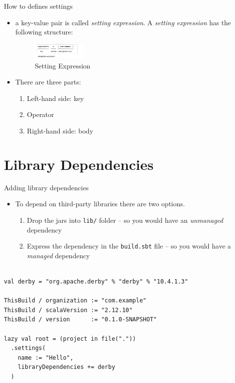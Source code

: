 \documentclass[presentation, aspectratio=169]{beamer}
\begin{document}
\begin{frame}[label={sec:org7a7a94f}]{How to defines settings}
\begin{itemize}
\item a key-value pair is called \emph{setting expression}. A \emph{setting expression} has the following structure:
\begin{figure}[htbp]
\centering
\includegraphics[width=100px]{./img/setting-expression.png}
\caption{\label{fig:org02a0ebb}Setting Expression}
\end{figure}

\item There are three parts:
\begin{enumerate}
\item Left-hand side: \alert{key}
\item \alert{Operator}
\item Right-hand side: \alert{body}
\end{enumerate}
\end{itemize}
\end{frame}

\section{Library Dependencies}
\label{sec:orgb6551c8}
\begin{frame}[label={sec:org67d1b05},fragile]{Adding library dependencies}
 \begin{itemize}
\item To depend on third-party libraries there are two options.
\begin{enumerate}
\item Drop the jars into \texttt{lib/} folder -- so you would have an \emph{unmanaged} dependency
\item Express the dependency in the \texttt{build.sbt} file -- so you would have a \emph{managed} dependency
\end{enumerate}
\end{itemize}
\begin{verbatim}

val derby = "org.apache.derby" % "derby" % "10.4.1.3"

ThisBuild / organization := "com.example"
ThisBuild / scalaVersion := "2.12.10"
ThisBuild / version      := "0.1.0-SNAPSHOT"

lazy val root = (project in file("."))
  .settings(
    name := "Hello",
    libraryDependencies += derby
  )

\end{verbatim}
\end{frame}
\end{document}
